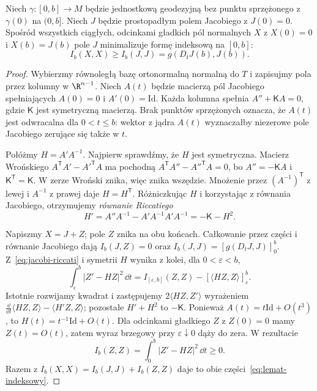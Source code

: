 \begin{lemat}[Indeksowy]
\label{lem:indeksowy-porownanie}
Niech $\gamma:[0,b]\to M$ będzie jednostkową
geodezyjną bez punktu sprzężonego z $\gamma(0)$
na $(0,b]$. Niech $J$ będzie prostopadłym
polem Jacobiego z $J(0)=0$. Spośród wszystkich
ciągłych, odcinkami gładkich pól normalnych $X$ z
$X(0)=0$ i $X(b)=J(b)$ pole $J$ minimalizuje
formę indeksową na $[0,b]$:
\begin{equation}\label{eq:lemat-indeksowy}
 I_b(X,X)\geq I_b(J,J)
       =g(D_tJ(b),J(b)).
\end{equation}
\end{lemat}
\begin{proof}
Wybierzmy równoległą bazę ortonormalną
normalną do $T$ i zapisujmy pola przez
kolumny w $\R^{n-1}$. Niech $A(t)$ będzie
macierzą pól Jacobiego spełniających
$A(0)=0$ i $A'(0)=\mathrm{Id}$.
Każda kolumna spełnia
$A''+\mathsf K A=0$, gdzie $\mathsf K$
jest symetryczną macierzą. Brak punktów
sprzężonych oznacza, że $A(t)$ jest odwracalna
dla $0<t\leq b$: wektor z jądra $A(t)$
wyznaczałby niezerowe pole Jacobiego zerujące
się także w $t$.

Połóżmy $H=A'A^{-1}$. Najpierw sprawdźmy,
że $H$ jest symetryczna. Macierz Wrońskiego
$A^{\mathsf T}A'-A'^{\mathsf T}A$ ma pochodną
$A^{\mathsf T}A''-A''^{\mathsf T}A=0$,
bo $A''=-\mathsf K A$ i $\mathsf K^{\mathsf T}
=\mathsf K$. W zerze Wroński znika, więc
znika wszędzie. Mnożenie przez
$(A^{-1})^{\mathsf T}$ z lewej i $A^{-1}$
z prawej daje $H=H^{\mathsf T}$.
Różniczkując $H$ i korzystając z równania
Jacobiego, otrzymujemy \emph{równanie Riccatiego}
\begin{equation}\label{eq:jacobi-riccati}
 H'=A''A^{-1}-A'A^{-1}A'A^{-1}
    =-\mathsf K-H^2.
\end{equation}

Napiszmy $X=J+Z$; pole $Z$ znika na obu
końcach. Całkowanie przez części i równanie
Jacobiego dają $I_b(J,Z)=0$ oraz
$I_b(J,J)=[g(D_tJ,J)]_0^b$.
Z~\eqref{eq:jacobi-riccati} i symetrii $H$
wynika z kolei, dla $0<\varepsilon<b$,
\[
 \int_\varepsilon^b|Z'-HZ|^2\,\dd t
 =I_{[\varepsilon,b]}(Z,Z)
   -[\langle HZ,Z\rangle]_{\varepsilon}^{b}.
\]
Istotnie rozwijamy kwadrat i zastępujemy
$2\langle HZ,Z'\rangle$ wyrażeniem
$\frac{\dd}{\dd t}\langle HZ,Z\rangle-\langle H'Z,Z\rangle$;
pozostałe $H'+H^2$ to $-\mathsf K$.
Ponieważ $A(t)=t\mathrm{Id}+O(t^3)$,
to $H(t)=t^{-1}\mathrm{Id}+O(t)$.
Dla odcinkami gładkiego $Z$ z $Z(0)=0$
mamy $Z(t)=O(t)$, zatem wyraz brzegowy
przy $\varepsilon\downarrow0$ dąży do zera.
W rezultacie
\[
 I_b(Z,Z)=\int_0^b|Z'-HZ|^2\,\dd t\geq0.
\]
Razem z $I_b(X,X)=I_b(J,J)+I_b(Z,Z)$
daje to obie części~\eqref{eq:lemat-indeksowy}.
\end{proof}

